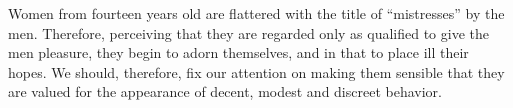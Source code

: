 Women from fourteen years old are flattered with the title of
``mistresses'' by the men. Therefore, perceiving that they are regarded
only as qualified to give the men pleasure, they begin to adorn themselves,
and in that to place ill their hopes. We should, therefore, fix our
attention on making them sensible that they are valued for the appearance
of decent, modest and discreet behavior. 
